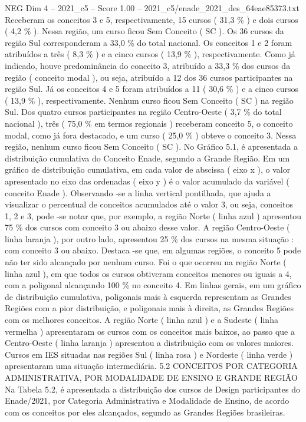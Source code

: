\begin{textsample}{NEG Dim 4 – 2021\_c5 – Score 1.00 – 2021\_c5/enade\_2021\_des\_64eae85373.txt}
Receberam os conceitos 3 e 5, respectivamente, 15 cursos ( 31,3 \% ) e dois cursos ( 4,2 \% ).
Nessa região, um curso ficou Sem Conceito ( SC ).
Os 36 cursos da região Sul corresponderam a 33,0 \% do total nacional.
Os conceitos 1 e 2 foram atribuídos a três ( 8,3 \% ) e a cinco cursos ( 13,9 \% ), respectivamente.
Como já indicado, houve predominância do conceito 3, atribuído a 33,3 \% dos cursos da região ( conceito modal ), ou seja, atribuído a 12 dos 36 cursos participantes na região Sul.
Já os conceitos 4 e 5 foram atribuídos a 11 ( 30,6 \% ) e a cinco cursos ( 13,9 \% ), respectivamente.
Nenhum curso ficou Sem Conceito ( SC ) na região Sul.
Dos quatro cursos participantes na região Centro-Oeste ( 3,7 \% do total nacional ), três ( 75,0 \% em termos regionais ) receberam conceito 5, o conceito modal, como já fora destacado, e um curso ( 25,0 \% ) obteve o conceito 3.
Nessa região, nenhum curso ficou Sem Conceito ( SC ).
No Gráfico 5.1, é apresentada a distribuição cumulativa do Conceito Enade, segundo a Grande Região.
Em um gráfico de distribuição cumulativa, em cada valor de abscissa ( eixo x ), o valor apresentado no eixo das ordenadas ( eixo y ) é o valor acumulado da variável ( conceito Enade ).
Observando -se a linha vertical pontilhada, que ajuda a visualizar o percentual de conceitos acumulados até o valor 3, ou seja, conceitos 1, 2 e 3, pode -se notar que, por exemplo, a região Norte ( linha azul ) apresentou 75 \% dos cursos com conceito 3 ou abaixo desse valor.
A região Centro-Oeste ( linha laranja ), por outro lado, apresentou 25 \% dos cursos na mesma situação : com conceito 3 ou abaixo.
Destaca -se que, em algumas regiões, o conceito 5 pode não ter sido alcançado por nenhum curso.
Foi o que ocorreu na região Norte ( linha azul ), em que todos os cursos obtiveram conceitos menores ou iguais a 4, com a poligonal alcançando 100 \% no conceito 4.
Em linhas gerais, em um gráfico de distribuição cumulativa, poligonais mais à esquerda representam as Grandes Regiões com a pior distribuição, e poligonais mais à direita, as Grandes Regiões com os melhores conceitos.
A região Norte ( linha azul ) e a Sudeste ( linha vermelha ) apresentaram os cursos com os conceitos mais baixos, ao passo que a Centro-Oeste ( linha laranja ) apresentou a distribuição com os valores maiores.
Cursos em IES situadas nas regiões Sul ( linha rosa ) e Nordeste ( linha verde ) apresentaram uma situação intermediária. 5.2 CONCEITOS POR CATEGORIA ADMINISTRATIVA, POR MODALIDADE DE ENSINO E GRANDE REGIÃO Na Tabela 5.2, é apresentada a distribuição dos cursos de Design participantes do Enade/2021, por Categoria Administrativa e Modalidade de Ensino, de acordo com os conceitos por eles alcançados, segundo as Grandes Regiões brasileiras.

\end{textsample}
